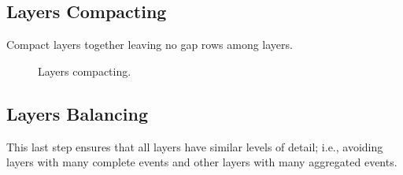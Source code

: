 \subsection{Layers Compacting}
Compact layers together leaving no gap rows among layers.

\begin{figure}[!htb]
	\centering
	\hfill
	\caption{Layers compacting.}
	\label{fig:compacting}
\end{figure}

\subsection{Layers Balancing}
This last step ensures that all layers have similar levels of detail; i.e., avoiding layers with many complete events and other layers with many aggregated events.

